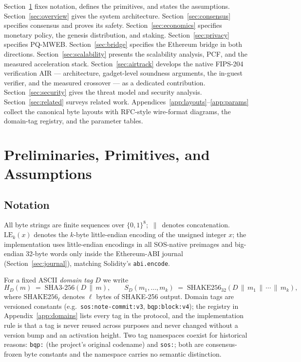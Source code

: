 \documentclass[11pt]{article}
\newcommand{\code}[1]{\texttt{#1}}
\newcommand{\shake}{SHAKE\mbox{-}256}
\newcommand{\LE}[1]{\mathrm{LE}_{#1}}
\newcommand{\concat}{\,\|\,}
\theoremstyle{plain}
\theoremstyle{definition}
\theoremstyle{remark}
\begin{document}
Section~\ref{sec:prelim} fixes notation, defines the primitives, and states the
assumptions. Section~\ref{sec:overview} gives the system architecture.
Section~\ref{sec:consensus} specifies consensus and proves its safety.
Section~\ref{sec:economics} specifies monetary policy, the genesis distribution, and
staking. Section~\ref{sec:privacy} specifies PQ-MWEB.
Section~\ref{sec:bridge} specifies the Ethereum bridge in both directions.
Section~\ref{sec:scalability} presents the scalability analysis, PCF, and the
measured acceleration stack. Section~\ref{sec:airtrack} develops the native
FIPS-204 verification AIR --- architecture, gadget-level soundness arguments,
the in-guest verifier, and the measured crossover --- as a dedicated
contribution. Section~\ref{sec:security} gives the threat model and
security analysis. Section~\ref{sec:related} surveys related work.
Appendices~\ref{app:layouts}--\ref{app:params} collect the canonical byte
layouts with RFC-style wire-format diagrams, the domain-tag registry, and the
parameter tables.

\section{Preliminaries, Primitives, and Assumptions}
\label{sec:prelim}

\subsection{Notation}
\label{sec:notation}

All byte strings are finite sequences over $\{0,1\}^8$; $\concat$ denotes
concatenation. $\LE{k}(x)$ denotes the $k$-byte little-endian encoding of the
unsigned integer $x$; the implementation uses little-endian encodings in all
SOS-native preimages and big-endian 32-byte words only inside the
Ethereum-ABI journal (Section~\ref{sec:journal}), matching Solidity's
\code{abi.encode}.

For a fixed ASCII \emph{domain tag} $D$ we write
\[
H_D(m) \;=\; \mathrm{SHA3\text{-}256}(D \concat m),
\qquad
S_D(m_1,\dots,m_k) \;=\; \mathrm{SHAKE256}_{32}(D \concat m_1 \concat \cdots \concat m_k),
\]
where $\mathrm{SHAKE256}_{\ell}$ denotes $\ell$ bytes of \shake{} output. Domain
tags are versioned constants (e.g.\ \code{sos:note-commit:v3},
\code{bqp:block:v4}); the registry in Appendix~\ref{app:domains} lists every
tag in the protocol, and the implementation rule is that a tag is never reused
across purposes and never changed without a version bump and an activation
height. Two tag namespaces coexist for historical reasons: \code{bqp:} (the
project's original codename) and \code{sos:}; both are consensus-frozen
byte constants and the namespace carries no semantic distinction.
\end{document}
